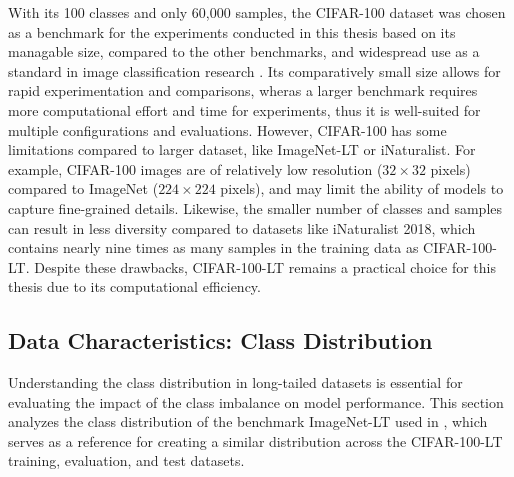 With its 100 classes and only 60,000 samples, the CIFAR-100 dataset was chosen as a benchmark for the experiments conducted in this thesis based on its managable size, compared to the other benchmarks, and widespread use as a standard in image classification research . Its comparatively small size allows for rapid experimentation and comparisons, wheras a larger benchmark requires more computational effort and time for experiments, thus it is well-suited for multiple configurations and evaluations. However, CIFAR-100 has some limitations compared to larger dataset, like ImageNet-LT or iNaturalist. For example, CIFAR-100 images are of relatively low resolution ($32 \times 32$ pixels) compared to ImageNet ($224 \times 224$ pixels), and may limit the ability of models to capture fine-grained details. Likewise, the smaller number of classes and samples can result in less diversity compared to datasets like iNaturalist 2018, which contains nearly nine times as many samples in the training data as CIFAR-100-LT. Despite these drawbacks, CIFAR-100-LT remains a practical choice for this thesis due to its computational efficiency. 


\subsection{Data Characteristics: Class Distribution}
Understanding the class distribution in long-tailed datasets is essential for evaluating the impact of the class imbalance on model performance. This section analyzes the class distribution of the benchmark ImageNet-LT used in \cite{zhang2023deep}, which serves as a reference for creating a similar distribution across the CIFAR-100-LT training, evaluation, and test datasets.  

